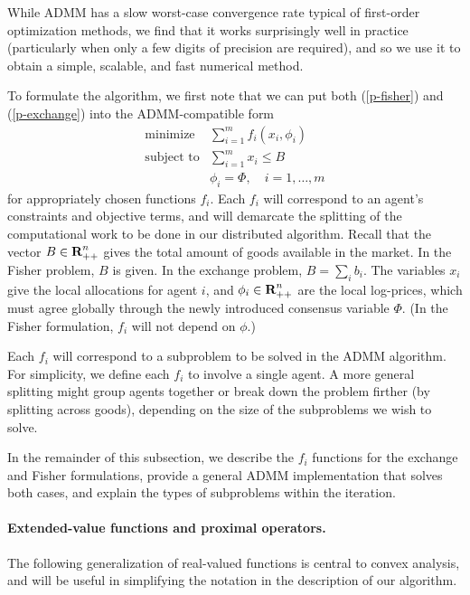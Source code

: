 \documentclass[12pt]{article}
\begin{document}
While ADMM has a slow worst-case convergence rate typical of first-order
optimization methods, we find that it works surprisingly well in practice
(particularly when only a few digits of precision are required), and so we
use it to obtain a simple, scalable, and fast numerical method.

To formulate the algorithm, we first note that we can put both (\ref{p-fisher}) and (\ref{p-exchange}) into
the ADMM-compatible form
\begin{equation}
\label{p-admm}
\begin{array}{ll}
\mbox{minimize} & \sum_{i=1}^m f_i(x_i, \phi_i) \\
\mbox{subject to} & \sum_{i=1}^m x_i \leq B\\
& \phi_i = \Phi, \quad i=1,\ldots,m
\end{array}
\end{equation}
for appropriately chosen functions $f_i$. Each $f_i$ will
correspond to an agent's constraints and objective terms, and will
demarcate the splitting of the computational work to be done in
our distributed algorithm. Recall that the vector $B \in
{\mbox{\bf R}}^n_{++}$ gives the total amount of goods available in the market. In the
Fisher problem, $B$ is given. In the exchange problem, $B = \sum_i b_i$. The
variables $x_i$ give the local allocations for agent $i$, and $\phi_i \in
{\mbox{\bf R}}^n_{++}$ are the local log-prices, which must agree globally through the
newly introduced consensus variable $\Phi$. (In the Fisher formulation, $f_i$
will not depend on $\phi$.)

Each $f_i$ will correspond to a subproblem to be solved in the ADMM algorithm.
For simplicity, we define each $f_i$ to involve a single agent. A more general
splitting might group agents together or break down the problem firther (by
splitting across goods), depending on the size of the subproblems we wish to
solve.

In the remainder of this subsection, we describe the $f_i$ functions for the
exchange and Fisher formulations, provide a general ADMM implementation that
solves both cases, and explain the types of subproblems within the iteration.

\paragraph{Extended-value functions and proximal operators.}
The following generalization of real-valued functions is central to convex
analysis, and will be useful in simplifying the notation in the description
of our algorithm.
\end{document}
